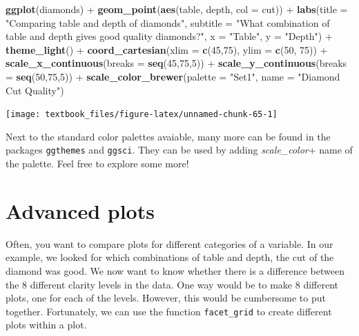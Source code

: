 \documentclass[]{tufte-book}
\newenvironment{Shaded}{}{}
\newcommand{\DataTypeTok}[1]{\textcolor[rgb]{0.56,0.13,0.00}{#1}}
\newcommand{\DecValTok}[1]{\textcolor[rgb]{0.25,0.63,0.44}{#1}}
\newcommand{\KeywordTok}[1]{\textcolor[rgb]{0.00,0.44,0.13}{\textbf{#1}}}
\newcommand{\NormalTok}[1]{#1}
\newcommand{\OperatorTok}[1]{\textcolor[rgb]{0.40,0.40,0.40}{#1}}
\newcommand{\StringTok}[1]{\textcolor[rgb]{0.25,0.44,0.63}{#1}}
\begin{document}
\begin{Shaded}
\begin{Highlighting}[]
\KeywordTok{ggplot}\NormalTok{(diamonds) }\OperatorTok{+}
\StringTok{    }\KeywordTok{geom_point}\NormalTok{(}\KeywordTok{aes}\NormalTok{(table, depth, }\DataTypeTok{col =}\NormalTok{ cut)) }\OperatorTok{+}\StringTok{ }
\StringTok{    }\KeywordTok{labs}\NormalTok{(}\DataTypeTok{title =} \StringTok{"Comparing table and depth of diamonds"}\NormalTok{,}
         \DataTypeTok{subtitle =} \StringTok{"What combination of table and depth gives good quality diamonds?"}\NormalTok{,}
         \DataTypeTok{x =} \StringTok{"Table"}\NormalTok{,}
         \DataTypeTok{y =} \StringTok{"Depth"}\NormalTok{) }\OperatorTok{+}
\StringTok{    }\KeywordTok{theme_light}\NormalTok{() }\OperatorTok{+}
\StringTok{    }\KeywordTok{coord_cartesian}\NormalTok{(}\DataTypeTok{xlim =} \KeywordTok{c}\NormalTok{(}\DecValTok{45}\NormalTok{,}\DecValTok{75}\NormalTok{), }\DataTypeTok{ylim =} \KeywordTok{c}\NormalTok{(}\DecValTok{50}\NormalTok{, }\DecValTok{75}\NormalTok{)) }\OperatorTok{+}
\StringTok{    }\KeywordTok{scale_x_continuous}\NormalTok{(}\DataTypeTok{breaks =} \KeywordTok{seq}\NormalTok{(}\DecValTok{45}\NormalTok{,}\DecValTok{75}\NormalTok{,}\DecValTok{5}\NormalTok{)) }\OperatorTok{+}
\StringTok{    }\KeywordTok{scale_y_continuous}\NormalTok{(}\DataTypeTok{breaks =} \KeywordTok{seq}\NormalTok{(}\DecValTok{50}\NormalTok{,}\DecValTok{75}\NormalTok{,}\DecValTok{5}\NormalTok{)) }\OperatorTok{+}
\StringTok{    }\KeywordTok{scale_color_brewer}\NormalTok{(}\DataTypeTok{palette =} \StringTok{"Set1"}\NormalTok{, }\DataTypeTok{name =} \StringTok{"Diamond Cut Quality"}\NormalTok{)}
\end{Highlighting}
\end{Shaded}

\texttt{[image: textbook\_files/figure-latex/unnamed-chunk-65-1]}

Next to the standard color palettes avaiable, many more can be found in the packages \texttt{ggthemes} and \texttt{ggsci}. They can be used by adding \emph{scale\_color}+ name of the palette. Feel free to explore some more!

\hypertarget{advanced-plots}{%
\section{Advanced plots}\label{advanced-plots}}

Often, you want to compare plots for different categories of a variable. In our example, we looked for which combinations of table and depth, the cut of the diamond was good. We now want to know whether there is a difference between the 8 different clarity levels in the data. One way would be to make 8 different plots, one for each of the levels. However, this would be cumbersome to put together. Fortunately, we can use the function \texttt{facet\_grid} to create different plots within a plot.
\end{document}

